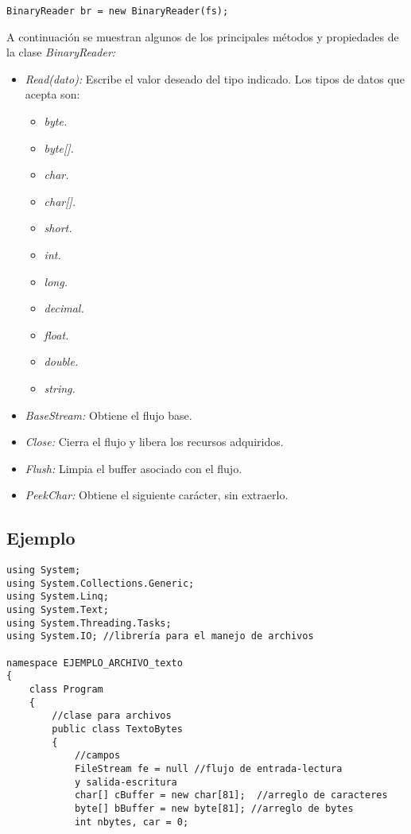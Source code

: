 \documentclass[letterpaper, 12pt]{article}
\begin{document}
\begin{justify}
\begin{verbatim}
BinaryReader br = new BinaryReader(fs);
        \end{verbatim}
        A continuación se muestran algunos de los principales métodos y propiedades de la clase \emph{BinaryReader:}
        \begin{itemize}
            \item \emph{Read(dato):} Escribe el valor deseado del tipo indicado. Los tipos de datos que acepta son:
            \begin{itemize}
                \item \emph{byte.}
                \item \emph{byte[].}
                \item \emph{char.}
                \item \emph{char[].}
                \item \emph{short.}
                \item \emph{int.}
                \item \emph{long.}
                \item \emph{decimal.}
                \item \emph{float.}
                \item \emph{double.}
                \item \emph{string.}
            \end{itemize}
            \item \emph{BaseStream:} Obtiene el flujo base.
            \item \emph{Close:} Cierra el flujo y libera los recursos adquiridos.
            \item \emph{Flush:} Limpia el buffer asociado con el flujo.
            \item \emph{PeekChar:} Obtiene el siguiente carácter, sin extraerlo.
        \end{itemize}
        \subsection{Ejemplo}
        \begin{verbatim}
using System;
using System.Collections.Generic;
using System.Linq;
using System.Text;
using System.Threading.Tasks;
using System.IO; //librería para el manejo de archivos

namespace EJEMPLO_ARCHIVO_texto
{
    class Program 
    {
        //clase para archivos
        public class TextoBytes
        {
            //campos
            FileStream fe = null //flujo de entrada-lectura 
            y salida-escritura
            char[] cBuffer = new char[81];  //arreglo de caracteres 
            byte[] bBuffer = new byte[81]; //arreglo de bytes
            int nbytes, car = 0;


\end{verbatim}
\end{justify}
\end{document}
